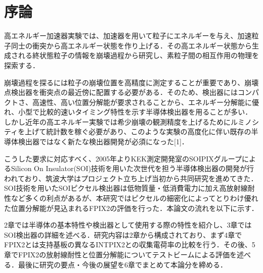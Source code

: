 \chapter{序論}
高エネルギー加速器実験では、加速器を用いて粒子にエネルギーを与え、加速粒子同士の衝突から高エネルギー状態を作り上げる．その高エネルギー状態から生成される終状態粒子の情報を崩壊過程から研究し、素粒子間の相互作用の物理を探索する．

崩壊過程を探るには粒子の崩壊位置を高精度に測定することが重要であり、崩壊点検出器を衝突点の最近傍に配置する必要がある．そのため、検出器にはコンパクトさ、高速性、高い位置分解能が要求されることから、エネルギー分解能に優れ、小型で比較的速いタイミング特性を示す半導体検出器を用ることが多い．しかし近年の高エネルギー実験では希少崩壊の観測精度を上げるためにルミノシティを上げて統計数を稼ぐ必要があり、このような実験の高度化に伴い既存の半導体検出器ではなく新たな検出器開発が必須になった[1]．

こうした要求に対応すべく、2005年よりKEK測定開発室のSOIPIXグループによるSilicon On Insulator(SOI)技術を用いた次世代を担う半導体検出器の開発が行われており、筑波大学はプロジェクト立ち上げ当初から共同研究を進めてきた．SOI技術を用いたSOIピクセル検出器は低物質量・低消費電力に加え高放射線耐性など多くの利点があるが、本研究ではピクセルの細密化によってとりわけ優れた位置分解能が見込まれるFPIX2の評価を行った．本論文の流れを以下に示す．

2章では半導体の基本特性や検出器として使用する際の特性を紹介し、3章ではSOI検出器の詳細を述べる．研究内容は2章から構成されており、まず4章でFPIX2とは支持基板の異なるINTPIX2との収集電荷率の比較を行う．その後、5章でFPIX2の放射線耐性と位置分解能についてテストビームによる評価を述べる．最後に研究の要点・今後の展望を6章でまとめて本論分を締める．
